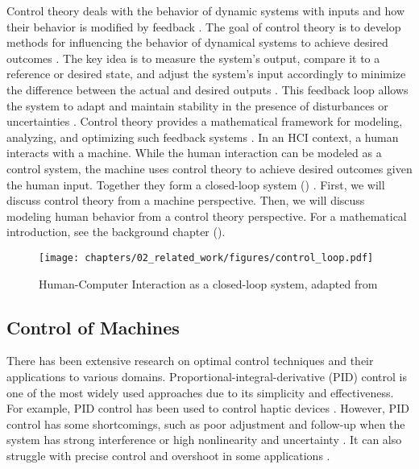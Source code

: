 Control theory deals with the behavior of dynamic systems with inputs and how their behavior is modified by feedback \cite{thummala2007, seal2019}. The goal of control theory is to develop methods for influencing the behavior of dynamical systems to achieve desired outcomes \cite{seal2019}. The key idea is to measure the system's output, compare it to a reference or desired state, and adjust the system's input accordingly to minimize the difference between the actual and desired outputs \cite{grigas2023}. This feedback loop allows the system to adapt and maintain stability in the presence of disturbances or uncertainties \cite{seal2019, vizvarova2021}. Control theory provides a mathematical framework for modeling, analyzing, and optimizing such feedback systems \cite{babblenewt2023, seal2019}.
In an HCI context, a human interacts with a machine. While the human interaction can be modeled as a control system, the machine uses control theory to achieve desired outcomes given the human input. Together they form a closed-loop system () \cite{murray2018control}. First, we will discuss control theory from a machine perspective. Then, we will discuss modeling human behavior from a control theory perspective. For a mathematical introduction, see the background chapter ().
\begin{figure}
\centering
\texttt{[image: chapters/02\_related\_work/figures/control\_loop.pdf]}
\caption{Human-Computer Interaction as a closed-loop system, adapted from \cite{murray2018control}}
\label{fig:control_loop}
\end{figure}
\subsection{Control of Machines}
There has been extensive research on optimal control techniques and their applications to various domains. Proportional-integral-derivative (PID) control is one of the most widely used approaches due to its simplicity and effectiveness. For example, PID control has been used to control haptic devices \cite{abut2018interface, ramos2016wavenet, pothi2014design}. However, PID control has some shortcomings, such as poor adjustment and follow-up when the system has strong interference or high nonlinearity and uncertainty \cite{krstic2017applicability}. It can also struggle with precise control and overshoot in some applications \cite{somefun2021dilemma}.

